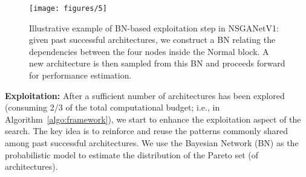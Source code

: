 \documentclass[journal]{IEEEtran}
\def\ourmethod{NSGANetV1}
\theoremstyle{definition}
\theoremstyle{remark}
\begin{document}
\begin{figure}[!tbh]
    \centering
    \texttt{[image: figures/5]}
    \caption{Illustrative example of BN-based exploitation step in \ourmethod{}: given past successful architectures, we construct a BN relating the dependencies between the four nodes inside the Normal block. A new architecture is then sampled from this BN and proceeds forward for performance estimation.}
    \label{fig:BN}
\end{figure}

\vspace{3pt}
\noindent\textbf{Exploitation:} After a sufficient number of architectures has been explored (consuming 2/3 of the total computational budget; {i.e.,  in Algorithm~\ref{algo:framework}}), we start to enhance the exploitation aspect of the search. The key idea is to reinforce and reuse the patterns commonly shared among past successful architectures. {We use the Bayesian Network (BN) \cite{pelikan1999boa} as the probabilistic model to estimate the distribution of the Pareto set (of architectures).}
\begin{comment}
The exploitation step in \ourmethod{} is heavily inspired by the Bayesian Optimization Algorithm (BOA) \cite{pelikan1999boa}, which is explicitly designed for problems with inherent correlations between the optimization variables.
\end{comment}
\end{document}
